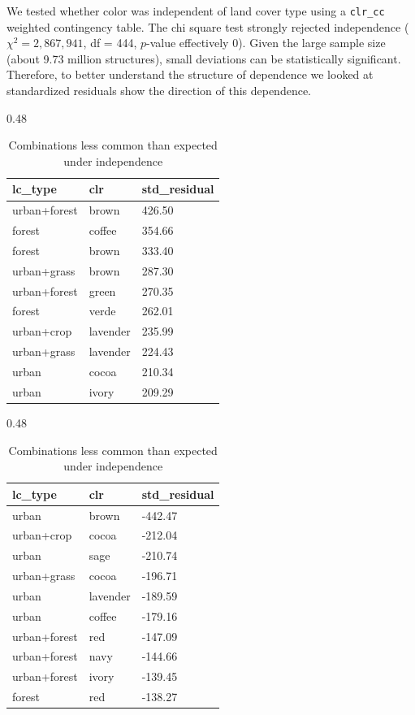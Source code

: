 \documentclass[11pt,letterpaper]{article}
\begin{document}
We tested whether color was independent of land cover type using a \texttt{clr\_cc} weighted contingency table. The chi square test strongly rejected independence ($\chi^2 = 2{,}867{,}941$, df = 444, $p$-value effectively 0). Given the large sample size (about 9.73 million structures), small deviations can be statistically significant. Therefore, to better understand the structure of dependence we looked at standardized residuals show the direction of this dependence.


\begin{table}[H]
\centering
\caption{Standardized residuals from the landcover x color chi square test.}
\label{tab:chi_square_residuals}

\begin{subtable}[t]{0.48\linewidth}
\centering
\caption{Combinations more common than expected under independence}
\begin{tabular}{lll}
    \toprule
    lc\_type & clr & std\_residual \\
    \midrule
    urban+forest & brown & 426.50 \\
    forest & coffee & 354.66 \\
    forest & brown & 333.40 \\
    urban+grass & brown & 287.30 \\
    urban+forest & green & 270.35 \\
    forest & verde & 262.01 \\
    urban+crop & lavender & 235.99 \\
    urban+grass & lavender & 224.43 \\
    urban & cocoa & 210.34 \\
    urban & ivory & 209.29 \\
    \bottomrule
\end{tabular}
\end{subtable}
\hfill
\begin{subtable}[t]{0.48\linewidth}
\centering
\caption{Combinations less common than expected under independence}
\begin{tabular}{lll}
    \toprule
    lc\_type & clr & std\_residual \\
    \midrule
    urban & brown & -442.47 \\
    urban+crop & cocoa & -212.04 \\
    urban & sage & -210.74 \\
    urban+grass & cocoa & -196.71 \\
    urban & lavender & -189.59 \\
    urban & coffee & -179.16 \\
    urban+forest & red & -147.09 \\
    urban+forest & navy & -144.66 \\
    urban+forest & ivory & -139.45 \\
    forest & red & -138.27 \\
    \bottomrule
\end{tabular}
\end{subtable}
\end{table}
\end{document}
